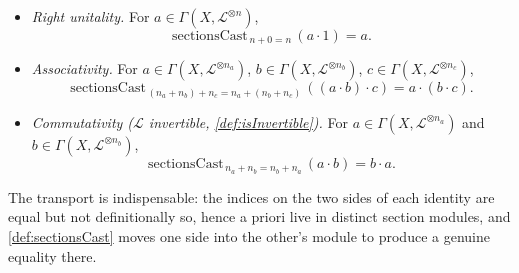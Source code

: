 \begin{lemma}
\begin{itemize}
\[      \]
    \item \emph{Right unitality.} For \(a \in \Gamma(X, \mathcal{L}^{\otimes n})\),
      \[
        \mathrm{sectionsCast}_{\,n+0=n}\,(a \cdot 1) = a .
      \]
    \item \emph{Associativity.} For
      \(a \in \Gamma(X, \mathcal{L}^{\otimes n_a})\),
      \(b \in \Gamma(X, \mathcal{L}^{\otimes n_b})\),
      \(c \in \Gamma(X, \mathcal{L}^{\otimes n_c})\),
      \[
        \mathrm{sectionsCast}_{\,(n_a+n_b)+n_c = n_a+(n_b+n_c)}\,
          ((a \cdot b) \cdot c) = a \cdot (b \cdot c) .
      \]
    \item \emph{Commutativity (\(\mathcal{L}\) invertible,
      \cref{def:isInvertible}).} For
      \(a \in \Gamma(X, \mathcal{L}^{\otimes n_a})\) and
      \(b \in \Gamma(X, \mathcal{L}^{\otimes n_b})\),
      \[
        \mathrm{sectionsCast}_{\,n_a+n_b = n_b+n_a}\,(a \cdot b) = b \cdot a .
      \]
  \end{itemize}
  The transport is indispensable: the indices on the two sides of each identity
  are equal but not definitionally so, hence a priori live in distinct section
  modules, and \cref{def:sectionsCast} moves one side into the other's module to
  produce a genuine equality there.
\end{lemma}


